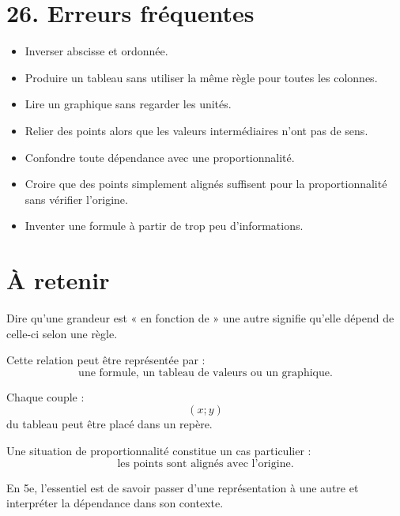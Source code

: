 \section{26. Erreurs fréquentes}

\begin{itemize}
\item Inverser abscisse et ordonnée.
\item Produire un tableau sans utiliser la même règle pour toutes les colonnes.
\item Lire un graphique sans regarder les unités.
\item Relier des points alors que les valeurs intermédiaires n'ont pas de sens.
\item Confondre toute dépendance avec une proportionnalité.
\item Croire que des points simplement alignés suffisent pour la proportionnalité sans vérifier l'origine.
\item Inventer une formule à partir de trop peu d'informations.
\end{itemize}

\section{À retenir}

\begin{aretenir}
Dire qu'une grandeur est « en fonction de » une autre signifie qu'elle dépend de celle-ci selon une règle.

Cette relation peut être représentée par :
\[
\boxed{\text{une formule, un tableau de valeurs ou un graphique}}.
\]

Chaque couple :
\[
(x;y)
\]
du tableau peut être placé dans un repère.

Une situation de proportionnalité constitue un cas particulier :
\[
\boxed{\text{les points sont alignés avec l'origine}}.
\]

En 5e, l'essentiel est de savoir passer d'une représentation à une autre et interpréter la dépendance dans son contexte.
\end{aretenir}
